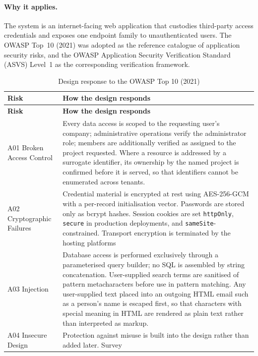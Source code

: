 \paragraph{Why it applies.}
The system is an internet-facing web application that custodies third-party
access credentials and exposes one endpoint family to unauthenticated users. The
OWASP Top~10 (2021) was adopted as the reference catalogue of application
security risks, and the OWASP Application Security Verification Standard (ASVS)
Level~1 as the corresponding verification framework.

\begin{longtable}{
  >{\raggedright\arraybackslash}p{}
  >{\raggedright\arraybackslash}p{}
}
\caption{Design response to the OWASP Top 10 (2021)}
\label{tab:owasp}\\
\toprule
\textbf{Risk} & \textbf{How the design responds} \\
\midrule
\endfirsthead
\toprule
\textbf{Risk} & \textbf{How the design responds} \\
\midrule
\endhead
\bottomrule
\endlastfoot
A01 Broken Access Control & Every data access is scoped to the requesting user's
company; administrative operations verify the administrator role; members are
additionally verified as assigned to the project requested. Where a resource is
addressed by a surrogate identifier, its ownership by the named project is confirmed
before it is served, so that identifiers cannot be enumerated across tenants. \\
\addlinespace
A02 Cryptographic Failures & Credential material is encrypted at rest using
AES-256-GCM with a per-record initialisation vector. Passwords are stored only as
bcrypt hashes. Session cookies are set \texttt{httpOnly}, \texttt{secure} in
production deployments, and \texttt{sameSite}-constrained. Transport encryption is
terminated by the hosting platforms \\
\addlinespace
A03 Injection & Database access is performed exclusively through a parameterised
query builder; no SQL is assembled by string concatenation. User-supplied search
terms are sanitised of pattern metacharacters before use in pattern matching. Any user-supplied text placed into an outgoing HTML email such as a person's
name is escaped first, so that characters with special meaning in HTML are
rendered as plain text rather than interpreted as markup. \\
\addlinespace
A04 Insecure Design & Protection against misuse is built into the design rather than added later. Survey

\end{longtable}
